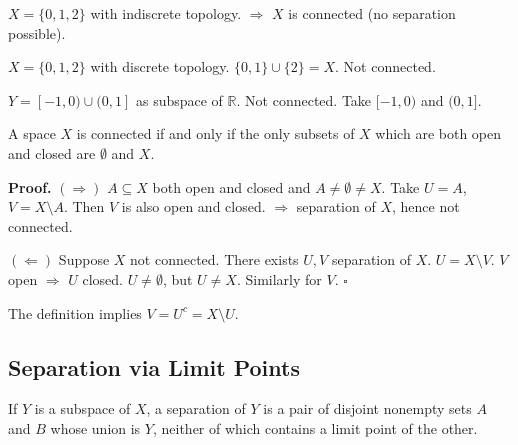 \documentclass[11pt]{report}
\renewenvironment{proof}[1][Proof]{\noindent\textbf{#1.} }{\hfill$\square$\par\vspace{5pt}}
\begin{document}
\begin{exbox}
$X = \{0, 1, 2\}$ with indiscrete topology. $\Rightarrow$ $X$ is connected (no separation possible).
\end{exbox}

\begin{exbox}
$X = \{0, 1, 2\}$ with discrete topology. $\{0, 1\} \cup \{2\} = X$. Not connected.
\end{exbox}

\begin{exbox}
$Y = [-1, 0) \cup (0, 1]$ as subspace of $\mathbb{R}$. Not connected. Take $[-1, 0)$ and $(0, 1]$.
\end{exbox}

\begin{lembox}
A space $X$ is connected if and only if the only subsets of $X$ which are both open and closed are $\emptyset$ and $X$.
\end{lembox}

\begin{proof}
$(\Rightarrow)$ $A \subseteq X$ both open and closed and $A \neq \emptyset \neq X$. Take $U = A$, $V = X \setminus A$. Then $V$ is also open and closed. $\Rightarrow$ separation of $X$, hence not connected.

$(\Leftarrow)$ Suppose $X$ not connected. There exists $U, V$ separation of $X$. $U = X \setminus V$. $V$ open $\Rightarrow$ $U$ closed. $U \neq \emptyset$, but $U \neq X$. Similarly for $V$.
\end{proof}

\begin{rembox}
The definition implies $V = U^c = X \setminus U$.
\end{rembox}

\subsection{Separation via Limit Points}

\begin{lembox}
If $Y$ is a subspace of $X$, a separation of $Y$ is a pair of disjoint nonempty sets $A$ and $B$ whose union is $Y$, neither of which contains a limit point of the other.
\end{lembox}
\end{document}
